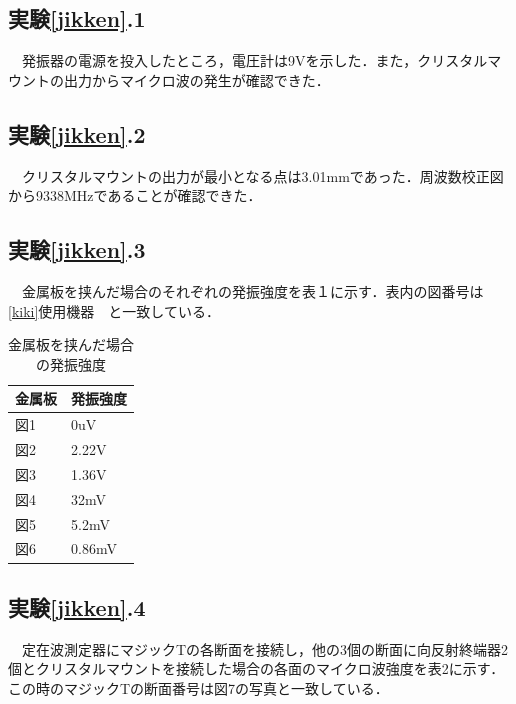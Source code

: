 \subsection{実験\ref{jikken}.1}
　発振器の電源を投入したところ，電圧計は9Vを示した．また，クリスタルマウントの出力からマイクロ波の発生が確認できた．

\subsection{実験\ref{jikken}.2}
　クリスタルマウントの出力が最小となる点は3.01mmであった．周波数校正図から9338MHzであることが確認できた．

\subsection{実験\ref{jikken}.3}
　金属板を挟んだ場合のそれぞれの発振強度を表１に示す．表内の図番号は　\ref{kiki}使用機器　と一致している．

  \begin{table}[H]
    \caption{金属板を挟んだ場合の発振強度}
    \centering
      \begin{tabular}{|l|l|}
      \hline
      金属板 & 発振強度   \\ \hline
      図1  & 0uV    \\ \hline
      図2  & 2.22V  \\ \hline
      図3  & 1.36V  \\ \hline
      図4  & 32mV   \\ \hline
      図5  & 5.2mV  \\ \hline
      図6  & 0.86mV \\ \hline
    \end{tabular}
  \end{table}

  \subsection{実験\ref{jikken}.4}
  　定在波測定器にマジックTの各断面を接続し，他の3個の断面に向反射終端器2個とクリスタルマウントを接続した場合の各面のマイクロ波強度を表2に示す．この時のマジックTの断面番号は図7の写真と一致している．

